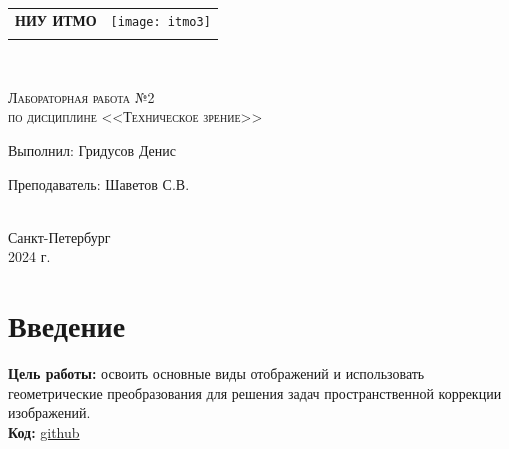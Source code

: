

\begin{titlepage}
    \newpage
    \begin{center}
    \begin{tabular}{cc}
         \parbox{12cm}{\centering \textbf{НИУ ИТМО}} & \parbox{4cm}{\texttt{[image: itmo3]}}\\
         \\
         \hline
         \hline
    \end{tabular}
    \end{center}
    
    \begin{center}
    \\ 
    \end{center}
    
    \vspace{1cm}
    
    \begin{center}
        \textsc{Лабораторная работа №2 \\ по дисциплине <<Техническое зрение>>}
    \end{center}
    
    \vspace{8em}
    
    \noindent Выполнил:  \hfill Гридусов Денис
    
    \vspace{20pt}
    
    \noindent Преподаватель: \hfill Шаветов С.В. \\
    \\
    \vfill
    
    \begin{center}
    Санкт-Петербург \\2024 г.
    \end{center}
    
    \end{titlepage}
    
    \tableofcontents
    \newpage
    \section{Введение}
    \noindent \textbf{Цель работы:} освоить основные виды отображений и использовать геометрические преобразования для решения задач пространственной коррекции изображений.
    \\
    \noindent \textbf{Код: } \href{https://github.com/D2J3D/Lab_CV}{github}
    \newpage
